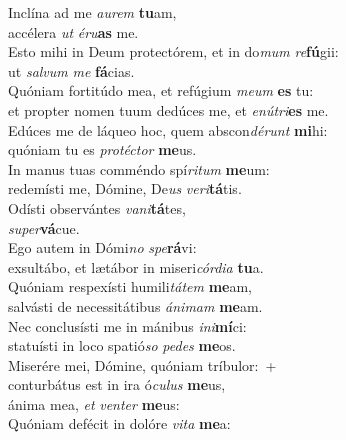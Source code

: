 \evenverse Inclína ad me \textit{au}\textit{rem} \textbf{tu}am,~\*\\
\evenverse accélera \textit{ut} \textit{é}\textit{ru}\textbf{as} me.\\
\oddverse Esto mihi in Deum protectórem, et in do\textit{mum} \textit{re}\textbf{fú}gii:~\*\\
\oddverse ut \textit{sal}\textit{vum} \textit{me} \textbf{fá}cias.\\
\evenverse Quóniam fortitúdo mea, et refúgium \textit{me}\textit{um} \textbf{es} tu:~\*\\
\evenverse et propter nomen tuum dedúces me, et \textit{e}\textit{nú}\textit{tri}\textbf{es} me.\\
\oddverse Edúces me de láqueo hoc, quem abscon\textit{dé}\textit{runt} \textbf{mi}hi:~\*\\
\oddverse quóniam tu es \textit{pro}\textit{té}\textit{ctor} \textbf{me}us.\\
\evenverse In manus tuas comméndo spí\textit{ri}\textit{tum} \textbf{me}um:~\*\\
\evenverse redemísti me, Dómine, De\textit{us} \textit{ve}\textit{ri}\textbf{tá}tis.\\
\oddverse Odísti observántes \textit{va}\textit{ni}\textbf{tá}tes,~\*\\
\oddverse \textit{su}\textit{per}\textbf{vá}cue.\\
\evenverse Ego autem in Dómi\textit{no} \textit{spe}\textbf{rá}vi:~\*\\
\evenverse exsultábo, et lætábor in miseri\textit{cór}\textit{di}\textit{a} \textbf{tu}a.\\
\oddverse Quóniam respexísti humili\textit{tá}\textit{tem} \textbf{me}am,~\*\\
\oddverse salvásti de necessitátibus \textit{á}\textit{ni}\textit{mam} \textbf{me}am.\\
\evenverse Nec conclusísti me in mánibus \textit{i}\textit{ni}\textbf{mí}ci:~\*\\
\evenverse statuísti in loco spatió\textit{so} \textit{pe}\textit{des} \textbf{me}os.\\
\oddverse Miserére mei, Dómine, quóniam tríbulor:~+\\
\oddverse  conturbátus est in ira ó\textit{cu}\textit{lus} \textbf{me}us,~\*\\
\oddverse ánima mea, \textit{et} \textit{ven}\textit{ter} \textbf{me}us:\\
\evenverse Quóniam defécit in dolóre \textit{vi}\textit{ta} \textbf{me}a:~\*\\
